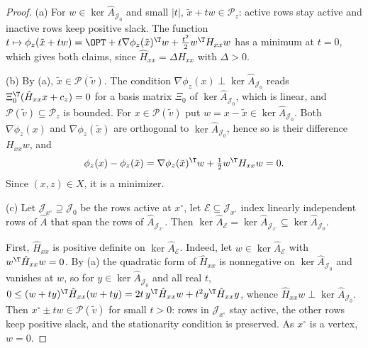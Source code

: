 \begin{proof}
(a) For $w\in\ker\hat A_{\mathcal J_0}$ and small $\lvert t\rvert$,
$\tilde x+tw\in\mathcal P_z$: active rows stay active and inactive rows keep
positive slack. The function
$t\mapsto\phi_z(\tilde x+tw)=\OPT+t\nabla\phi_z(\tilde x)^{\T}w+\frac{t^2}{2}w^{\T}H_{xx}w$
has a minimum at $t=0$, which gives both claims, since
$\hat H_{xx}=\Delta H_{xx}$ with $\Delta>0$.

(b) By (a), $\tilde x\in\mathcal P(\tilde v)$. The condition
$\nabla\phi_z(x)\perp\ker\hat A_{\mathcal J_0}$ reads
$\Xi_0^{\T}(\hat H_{xx}x+c_z)=0$ for a basis matrix $\Xi_0$ of
$\ker\hat A_{\mathcal J_0}$, which is linear, and
$\mathcal P(\tilde v)\subseteq\mathcal P_z$ is bounded. For
$x\in\mathcal P(\tilde v)$ put $w=x-\tilde x\in\ker\hat A_{\mathcal J_0}$. Both
$\nabla\phi_z(x)$ and $\nabla\phi_z(\tilde x)$ are orthogonal to
$\ker\hat A_{\mathcal J_0}$, hence so is their difference $H_{xx}w$, and
\[
\phi_z(x)-\phi_z(\tilde x)=\nabla\phi_z(\tilde x)^{\T}w+\tfrac12w^{\T}H_{xx}w=0 .
\]
Since $(x,z)\in X$, it is a minimizer.

(c) Let $\mathcal J_{x^\circ}\supseteq\mathcal J_0$ be the rows active at
$x^\circ$, let $\mathcal E\subseteq\mathcal J_{x^\circ}$ index linearly
independent rows of $\hat A$ that span the rows of
$\hat A_{\mathcal J_{x^\circ}}$. Then
$\ker\hat A_{\mathcal E}=\ker\hat A_{\mathcal J_{x^\circ}}\subseteq\ker\hat A_{\mathcal J_0}$.

First, $\hat H_{xx}$ is positive definite on $\ker\hat A_{\mathcal E}$. Indeed,
let $w\in\ker\hat A_{\mathcal E}$ with $w^{\T}\hat H_{xx}w=0$. By (a) the
quadratic form of $\hat H_{xx}$ is nonnegative on $\ker\hat A_{\mathcal J_0}$
and vanishes at $w$, so for $y\in\ker\hat A_{\mathcal J_0}$ and all real $t$,
$0\le(w+ty)^{\T}\hat H_{xx}(w+ty)=2t\,y^{\T}\hat H_{xx}w+t^2y^{\T}\hat H_{xx}y$,
whence $\hat H_{xx}w\perp\ker\hat A_{\mathcal J_0}$. Then
$x^\circ\pm tw\in\mathcal P(\tilde v)$ for small $t>0$: rows in
$\mathcal J_{x^\circ}$ stay active, the other rows keep positive slack, and the
stationarity condition is preserved. As $x^\circ$ is a vertex, $w=0$.


\end{proof}
